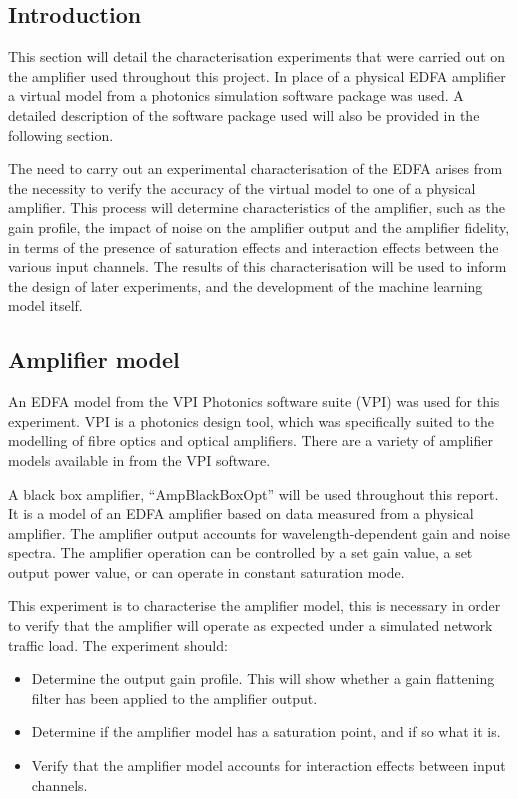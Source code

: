 \subsection{Introduction}
This section will detail the characterisation experiments that were carried out on the amplifier used throughout this project. In place of a physical EDFA amplifier a virtual model from a photonics simulation software package was used. A detailed description of the software package used will also be provided in the following section.	

The need to carry out an experimental characterisation of the EDFA arises from the necessity to verify the accuracy of the virtual model to one of a physical amplifier. This process will determine characteristics of the amplifier, such as the gain profile, the impact of noise on the amplifier output and the amplifier fidelity, in terms of the presence of saturation effects and interaction effects between the various input channels. The results of this characterisation will be used to inform the design of later experiments, and the development of the machine learning model itself.

\subsection{Amplifier model}
An EDFA model from the VPI Photonics software suite (VPI) was used for this experiment. VPI is a photonics design tool, which was specifically suited to the modelling of fibre optics and optical amplifiers. There are a variety of amplifier models available in from the VPI software. 

A black box amplifier, “AmpBlackBoxOpt” will be used throughout this report. It is a model of an EDFA amplifier based on data measured from a physical amplifier. The amplifier output accounts for wavelength-dependent gain and noise spectra. The amplifier operation can be controlled by a set gain value, a set output power value, or can operate in constant saturation mode.

This experiment is to characterise the amplifier model, this is necessary in order to verify that the amplifier will operate as expected under a simulated network traffic load.  The experiment should:

\begin{itemize}    
    \item Determine the output gain profile. This will show whether a gain flattening filter has been applied to the amplifier output.\\

    \item Determine if the amplifier model has a saturation point, and if so what it is.\\
    
    \item Verify that the amplifier model accounts for interaction effects between input channels.\\
\end{itemize}





